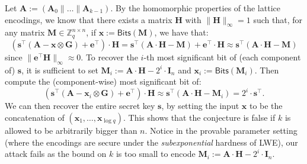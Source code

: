 \documentclass{theoretics}
\newcommand{\Z}{\mathbb{Z}}
\newcommand{\id}{\ensuremath{\mathbf{I}}}
\begin{document}
Let $\mathbf{A}:=(\mathbf{A}_0 \mathbin{\|}\dots\mathbin{\|}\mathbf{A}_{k-1})$. By the homomorphic properties of the lattice encodings, we know that there exists a matrix $\mathbf{H}$ with $\|\mathbf{H}\|_\infty =1$ such that, for any matrix $\mathbf{M}\in\Z_q^{n\times n}$, if $\mathbf{x}:=\mathsf{Bits}(\mathbf{M})$, we have that:
\[
(\mathbf{s}^\intercal(\mathbf{A} - \mathbf{x}\otimes  \mathbf{G}) + \mathbf{e}^\intercal)\cdot \mathbf{H}= \mathbf{s}^\intercal  (\mathbf{A}\cdot \mathbf{H}-\mathbf{M}) + \mathbf{e}^\intercal \cdot \mathbf{H}
\approx \mathbf{s}^\intercal (\mathbf{A}\cdot \mathbf{H}-\mathbf{M})
\]
since $\|\mathbf{e}^\intercal  \mathbf{H}\|_\infty \approx 0$.  
To recover the $i$-th most significant bit of (each component of) $\mathbf{s}$, it is sufficient to set $\mathbf{M}_i:=\mathbf{A}\cdot \mathbf{H}- 2^i\cdot \id_n$ and $\mathbf{x}_i := \mathsf{Bits}(\mathbf{M}_i)$. Then compute the (component-wise) most significant bit of:
\[
(\mathbf{s}^\intercal(\mathbf{A} - \mathbf{x}_i\otimes  \mathbf{G}) + \mathbf{e}^\intercal)\cdot \mathbf{H} \approx \mathbf{s}^\intercal (\mathbf{A}\cdot \mathbf{H}-\mathbf{M}_i) = 2^i\cdot\mathbf{s}^\intercal.
\]
We can then recover the entire secret key $\mathbf{s}$, by setting the input $\mathbf{x}$ to be the concatenation of $(\mathbf{x}_1, \dots, \mathbf{x}_{\log q})$. This shows that the conjecture is false if $k$ is allowed to be arbitrarily bigger than $n$. Notice in the provable parameter setting (where the encodings are secure under the \emph{subexponential} hardness of LWE), our attack fails as the bound on $k$ is too small to encode $\mathbf{M}_i:=\mathbf{A}\cdot \mathbf{H}- 2^i\cdot \id_n$.

\newpage
   \printbibliography
 
\end{document}
